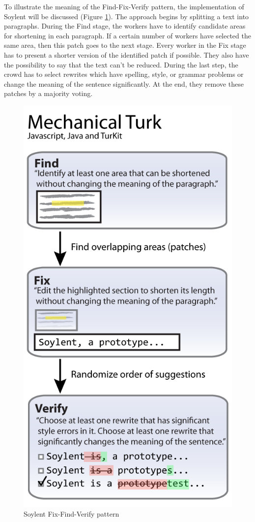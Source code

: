 To illustrate the meaning of the Find-Fix-Verify pattern, the implementation of Soylent will be discussed (Figure \ref{fixfindverify}). The approach begins by splitting a text into paragraphs. During the Find stage, the workers have to identify candidate areas for shortening in each paragraph. If a certain number of workers have selected the same area, then this patch goes to the next stage. Every worker in the Fix stage has to present a shorter version of the identified patch if possible. They also have the possibility to say that the text can't be reduced. During the last step, the crowd has to select rewrites which have spelling, style, or grammar problems or change the meaning of the sentence significantly. At the end, they remove these patches by a majority voting.
\begin{figure}[h!]
\centering
\includegraphics[scale=0.35]{images/soylent_system_overview.png}
\caption{Soylent Fix-Find-Verify pattern}
\label{fixfindverify}
\end{figure}

